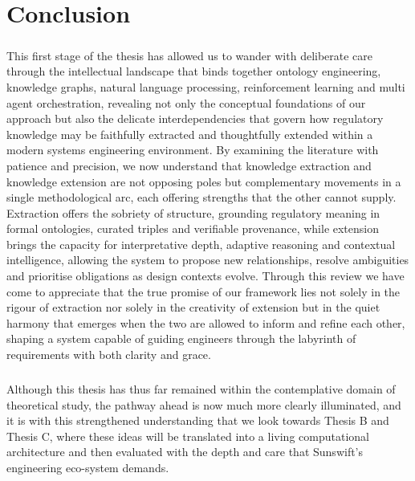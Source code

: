 \chapter{Conclusion}

    \paragraph{}
    This first stage of the thesis has allowed us to wander with deliberate care through the intellectual landscape that binds together ontology engineering, knowledge graphs, natural language processing, reinforcement learning and multi agent orchestration, revealing not only the conceptual foundations of our approach but also the delicate interdependencies that govern how regulatory knowledge may be faithfully extracted and thoughtfully extended within a modern systems engineering environment. By examining the literature with patience and precision, we now understand that knowledge extraction and knowledge extension are not opposing poles but complementary movements in a single methodological arc, each offering strengths that the other cannot supply. Extraction offers the sobriety of structure, grounding regulatory meaning in formal ontologies, curated triples and verifiable provenance, while extension brings the capacity for interpretative depth, adaptive reasoning and contextual intelligence, allowing the system to propose new relationships, resolve ambiguities and prioritise obligations as design contexts evolve. Through this review we have come to appreciate that the true promise of our framework lies not solely in the rigour of extraction nor solely in the creativity of extension but in the quiet harmony that emerges when the two are allowed to inform and refine each other, shaping a system capable of guiding engineers through the labyrinth of requirements with both clarity and grace.

    \paragraph{}
    Although this thesis has thus far remained within the contemplative domain of theoretical study, the pathway ahead is now much more clearly illuminated, and it is with this strengthened understanding that we look towards Thesis B and Thesis C, where these ideas will be translated into a living computational architecture and then evaluated with the depth and care that Sunswift’s engineering eco-system demands. 

    \newpage
